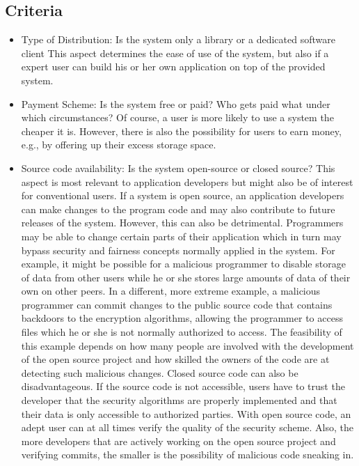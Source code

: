 \subsection{Criteria}
\begin{itemize}
\item Type of Distribution: Is the system only a library or a dedicated software client
This aspect determines the ease of use of the system, but also if a expert user can build his or her own application on top of the provided system.

\item Payment Scheme: Is the system free or paid? Who gets paid what under which circumstances?
Of course, a user is more likely to use a system the cheaper it is. However, there is also the possibility for users to earn money, e.g., by offering up their excess storage space.

\item Source code availability: Is the system open-source or closed source?
This aspect is most relevant to application developers but might also be of interest for conventional users. If a system is open source, an application developers can make changes to the program code and may also contribute to future releases of the system. However, this can also be detrimental. Programmers may be able to change certain parts of their application which in turn may bypass security and fairness concepts normally applied in the system. For example, it might be possible for a malicious programmer to disable storage of data from other users while he or she stores large amounts of data of their own on other peers. In a different, more extreme example, a malicious programmer can commit changes to the public source code that contains backdoors to the encryption algorithms, allowing the programmer to access files which he or she is not normally authorized to access. The feasibility of this example depends on how many people are involved with the development of the open source project and how skilled the owners of the code are at detecting such malicious changes.
Closed source code can also be disadvantageous. If the source code is not accessible, users have to trust the developer that the security algorithms are properly implemented and that their data is only accessible to authorized parties. With open source code, an adept user can at all times verify the quality of the security scheme. Also, the more developers that are actively working on the open source project and verifying commits, the smaller is the possibility of malicious code sneaking in.


\end{itemize}
